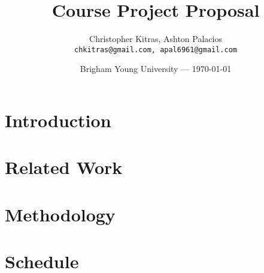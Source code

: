 \documentclass{article}
\title{Course Project Proposal} %
\author{Christopher Kitras, Ashton Palacios\\ \texttt{chkitras@gmail.com, apal6961@gmail.com}} %
\date{Brigham Young University --- \today} %
\begin{document}
\maketitle %

\section*{Introduction}

\section*{Related Work}

\section*{Methodology}

\section*{Schedule}
\end{document}
